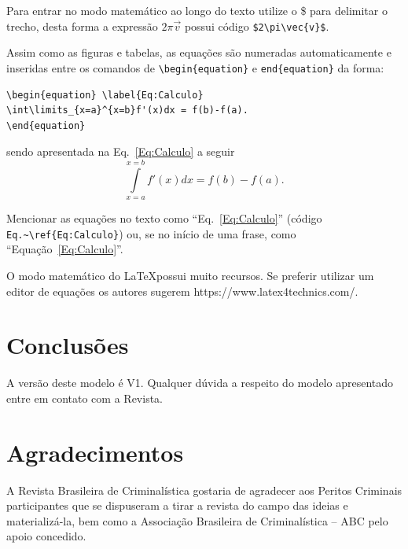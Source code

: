 \documentclass{RBClatex}
\begin{document}
Para entrar no modo matemático ao longo do texto utilize o \$ para delimitar o trecho, desta forma a expressão $2\pi\vec{v}$ possui código \verb|$2\pi\vec{v}$|.

Assim como as figuras e tabelas, as equações são numeradas automaticamente e inseridas entre os comandos de \verb|\begin{equation}| e \verb|end{equation}| da forma:
\begin{lstlisting}
\begin{equation} \label{Eq:Calculo}
\int\limits_{x=a}^{x=b}f'(x)dx = f(b)-f(a).
\end{equation}
\end{lstlisting}
sendo apresentada na Eq.~\ref{Eq:Calculo} a seguir
\begin{equation} \label{Eq:Calculo}
\int\limits_{x = a}^{x=b} f'(x)dx = f(b) - f(a).
\end{equation}

Mencionar as equações no texto como “Eq.~\ref{Eq:Calculo}” (código \verb|Eq.~\ref{Eq:Calculo}|) ou, se no início de uma frase, como “Equação~\ref{Eq:Calculo}”.

O modo matemático do \LaTeX possui muito recursos. Se preferir utilizar um editor de equações os autores sugerem https://www.latex4technics.com/.


\section{Conclusões}

A versão deste modelo é V1. Qualquer dúvida a respeito do modelo apresentado entre em contato com a Revista.

\section*{Agradecimentos}

A Revista Brasileira de Criminalística gostaria de agradecer aos Peritos Criminais participantes que se dispuseram a tirar a revista do campo das ideias e materializá-la, bem como a Associação Brasileira de Criminalística – ABC pelo apoio concedido.
%
%
\end{document}
